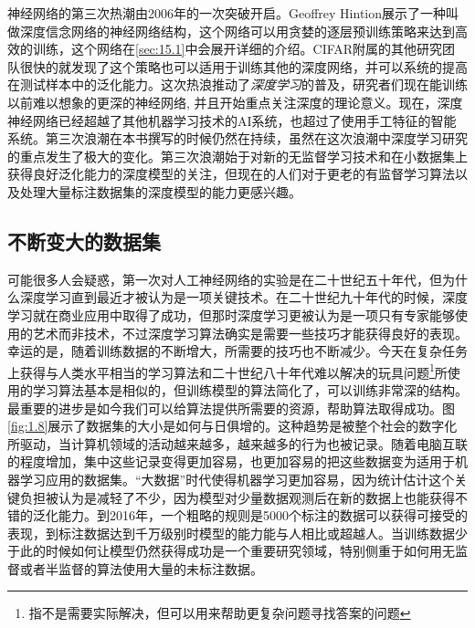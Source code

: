 \documentclass[a4paper,11pt]{book}
\begin{document}
神经网络的第三次热潮由2006年的一次突破开启。Geoffrey Hintion展示了一种叫做深度信念网络的神经网络结构，这个网络可以用贪婪的逐层预训练策略来达到高效的训练，这个网络在\ref{sec:15.1}中会展开详细的介绍。CIFAR附属的其他研究团队很快的就发现了这个策略也可以适用于训练其他的深度网络，并可以系统的提高在测试样本中的泛化能力。这次热浪推动了\emph{深度学习}的普及，研究者们现在能训练以前难以想象的更深的神经网络, 并且开始重点关注深度的理论意义。现在，深度神经网络已经超越了其他机器学习技术的AI系统，也超过了使用手工特征的智能系统。第三次浪潮在本书撰写的时候仍然在持续，虽然在这次浪潮中深度学习研究的重点发生了极大的变化。第三次浪潮始于对新的无监督学习技术和在小数据集上获得良好泛化能力的深度模型的关注，但现在的人们对于更老的有监督学习算法以及处理大量标注数据集的深度模型的能力更感兴趣。


\subsection{不断变大的数据集}
\label{sec:1.2.2}


可能很多人会疑惑，第一次对人工神经网络的实验是在二十世纪五十年代，但为什么深度学习直到最近才被认为是一项关键技术。在二十世纪九十年代的时候，深度学习就在商业应用中取得了成功，但那时深度学习更被认为是一项只有专家能够使用的艺术而非技术，不过深度学习算法确实是需要一些技巧才能获得良好的表现。幸运的是，随着训练数据的不断增大，所需要的技巧也不断减少。今天在复杂任务上获得与人类水平相当的学习算法和二十世纪八十年代难以解决的玩具问题\footnote{指不是需要实际解决，但可以用来帮助更复杂问题寻找答案的问题}所使用的学习算法基本是相似的，但训练模型的算法简化了，可以训练非常深的结构。最重要的进步是如今我们可以给算法提供所需要的资源，帮助算法取得成功。图\ref{fig:1.8}展示了数据集的大小是如何与日俱增的。这种趋势是被整个社会的数字化所驱动，当计算机领域的活动越来越多，越来越多的行为也被记录。随着电脑互联的程度增加，集中这些记录变得更加容易，也更加容易的把这些数据变为适用于机器学习应用的数据集。“大数据”时代使得机器学习更加容易，因为统计估计这个关键负担被认为是减轻了不少，因为模型对少量数据观测后在新的数据上也能获得不错的泛化能力。到2016年，一个粗略的规则是5000个标注的数据可以获得可接受的表现，到标注数据达到千万级别时模型的能力能与人相比或超越人。当训练数据少于此的时候如何让模型仍然获得成功是一个重要研究领域，特别侧重于如何用无监督或者半监督的算法使用大量的未标注数据。
\end{document}
